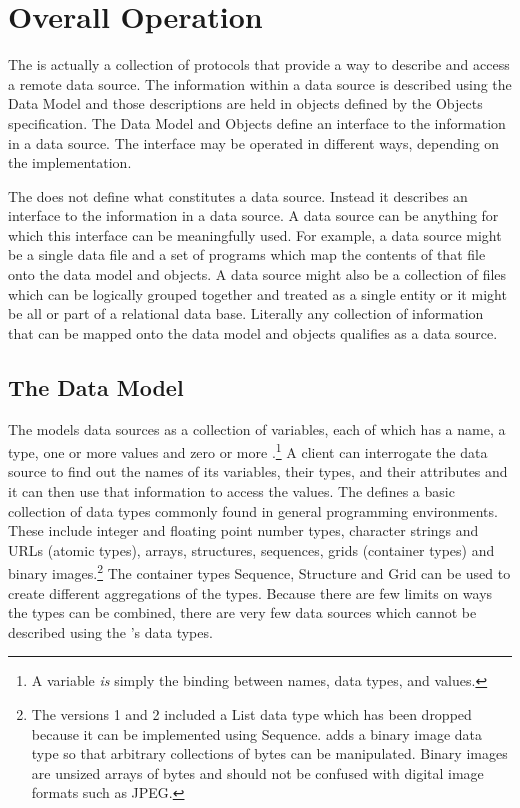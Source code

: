 \documentclass[justify]{dods-paper}
\begin{document}
\section{Overall Operation}

The \DAP is actually a collection of protocols that
provide a way to describe and access a remote data source. The
information within a data source is described using the \DAP Data
Model and those descriptions are held in objects defined by the \DAP
Objects specification.  The Data Model and Objects define an
interface to the information in a data source.  The interface may be
operated in different ways, depending on the implementation.

The \DAP does not define what constitutes a data source. Instead it
describes an interface to the information in a data source. A data
source can be anything for which this interface can be meaningfully
used. For example, a data source might be a single data file and a set
of programs which map the contents of that file onto the \DAP data
model and objects.  A data source might also be a collection of files
which can be logically grouped together and treated as a single entity
or it might be all or part of a relational data base. Literally any
collection of information that can be mapped onto the \DAP data model
and objects qualifies as a \DAP data source.

\subsection{The \DAP Data Model}


The \DAP models data sources as a collection of variables, each of
which has a name, a type, one or more values and zero or more
.\footnote{A variable \emph{is} simply the binding
  between names, data types, and values.}  A client can interrogate
the data source to find out the names of its variables, their types,
and their attributes and it can then use that information to access
the values.  The \DAP defines a basic collection of data types
commonly found in general programming environments.  These include
integer and floating point number types, character strings and URLs
(atomic types), arrays, structures, sequences, grids (container types)
and binary images.\footnote{The \DAP versions 1 and 2 included a List
  data type which has been dropped because it can be implemented using
  Sequence.  \dapversion adds a binary image data type so that
  arbitrary collections of bytes can be manipulated. Binary images are
  unsized arrays of bytes and should not be confused with digital
  image formats such as JPEG.}  The container types Sequence,
Structure and Grid can be used to create different aggregations of the
types. Because there are few limits on ways the types can be combined,
there are very few data sources which cannot be described using the
\DAP's data types.
\end{document}
